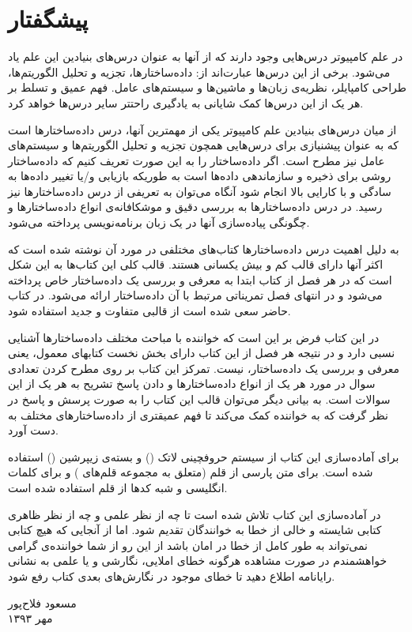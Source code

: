 \section*{پیشگفتار}
\thispagestyle{empty}
در علم کامپیوتر درس‌هایی وجود دارند که از آنها به عنوان درس‌های بنیادین این علم یاد می‌شود. برخی از این درس‌ها عبارت‌اند از: داده‌ساختارها، تجزیه و تحلیل الگوریتم‌ها، طراحی کامپایلر، نظریه‌ی زبان‌ها و ماشین‌ها و سیستم‌های عامل. فهم عمیق و تسلط بر هر یک از این درس‌ها کمک شایانی به یادگیری راحتتر سایر درس‌ها خواهد کرد.

از میان درس‌های بنیادین علم کامپیوتر یکی از مهمترین آنها، درس داده‌ساختارها است که به عنوان پیشنیازی برای درس‌هایی همچون تجزیه و تحلیل الگوریتم‌ها و سیستم‌های عامل نیز مطرح است. اگر داده‌ساختار را به این صورت تعریف کنیم که {\prq}داده‌ساختار روشی برای ذخیره و سازماندهی داده‌ها است به طوریکه بازیابی و/یا تغییر داده‌ها به سادگی و با کارایی بالا انجام شود{\plq} آنگاه می‌توان به تعریفی از درس داده‌ساختارها نیز رسید. در درس داده‌ساختارها به بررسی دقیق و موشکافانه‌ی انواع داده‌ساختارها و چگونگی پیاده‌سازی آنها در یک زبان برنامه‌نویسی پرداخته می‌شود.

به دلیل اهمیت درس داده‌ساختارها کتاب‌های مختلفی در مورد آن نوشته شده است که اکثر آنها دارای قالب کم و بیش یکسانی هستند. قالب کلی این کتاب‌ها به این شکل است که در هر فصل از کتاب ابتدا به معرفی و بررسی یک داده‌ساختار خاص پرداخته می‌شود و در انتهای فصل تمریناتی مرتبط با آن داده‌ساختار ارائه می‌شود. در کتاب حاضر سعی شده است از قالبی متفاوت و جدید استفاده شود.

در این کتاب فرض بر این است که خواننده با مباحث مختلف داده‌ساختارها آشنایی نسبی دارد و در نتیجه هر فصل از این کتاب دارای بخش نخست کتابهای معمول، یعنی معرفی و بررسی یک داده‌ساختار، نیست. تمرکز این کتاب بر روی مطرح کردن تعدادی سوال در مورد هر یک از انواع داده‌ساختارها و دادن پاسخ تشریح به هر یک از این سوالات است. به بیانی دیگر می‌توان قالب این کتاب را به صورت پرسش و پاسخ در نظر گرفت که به خواننده کمک می‌کند تا فهم عمیقتری از داده‌ساختارهای مختلف به دست آورد.

برای آماده‌سازی این کتاب از سیستم حروفچینی لاتک ({\lr{\LaTeX}}) و بسته‌ی زیپرشین ({\lr{\XePersian}}) استفاده شده است. برای متن پارسی از قلم {} (متعلق به مجموعه قلم‌های {}) و برای کلمات انگلیسی و شبه کدها از قلم {} استفاده شده است.

در آماده‌سازی این کتاب تلاش شده است تا چه از نظر علمی و چه از نظر ظاهری کتابی شایسته و خالی از خطا به خوانندگان تقدیم شود. اما از آنجایی که هیچ کتابی نمی‌تواند به طور کامل از خطا در امان باشد از این رو از شما خواننده‌ی گرامی خواهشمندم در صورت مشاهده هرگونه خطای املایی، نگارشی و یا علمی به نشانی رایانامه {} اطلاع دهید تا خطای موجود در نگارش‌های بعدی کتاب رفع شود.

\begin{flushleft}
\small
مسعود فلاح‌پور\\
مهر ۱۳۹۳
\end{flushleft}